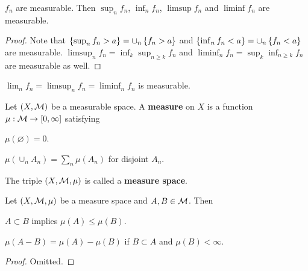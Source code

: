 \begin{proposition}
    $f_n$ are measurable. Then $\sup_n f_n$, $\inf_n f_n$, $\limsup f_n$ 
    and $\liminf f_n$ are measurable.
\end{proposition}
\begin{proof}
    Note that $\left\{ {\sup_n f_n > a} \right\} = \cup_n \left\{ {f_n > a} \right\}$ and 
    $\left\{ {\inf_n f_n < a} \right\} = \cup_n \left\{ {f_n < a} \right\}$ are measurable. 
    $\limsup_n f_n = \inf_k\sup_{n\geq k} f_n$ and $\liminf_n f_n 
    = \sup_k\inf_{n\geq k} f_n$ are measurable as well.
\end{proof}
\begin{remark}
    $\lim_n f_n = \limsup_n f_n = \liminf_n f_n$ is measurable. 
\end{remark}

\begin{definition}
    Let $(X,\mathcal{M})$ be a measurable space. A \textbf{measure} on $X$ is a 
    function $\mu:\mathcal{M}\to[0,\infty]$ satisfying
    \begin{thmenum}
        \item $\mu(\varnothing) = 0$.
        \item $\mu(\cup_n A_n) = \sum_n \mu(A_n)$ for disjoint $A_n$.
    \end{thmenum}
    The triple $(X,\mathcal{M},\mu)$ is called a \textbf{measure space}.
\end{definition}

\begin{proposition}
    Let $(X,\mathcal{M},\mu)$ be a measure space and $A,B\in\mathcal{M}$. Then
    \begin{thmenum}
        \item $A\subset B$ implies $\mu(A)\leq \mu(B)$.
        \item $\mu(A-B) = \mu(A) - \mu(B)$ if $B\subset A$ and $\mu(B)<\infty$.
    \end{thmenum}
\end{proposition}
\begin{proof}
    Omitted.
\end{proof}


